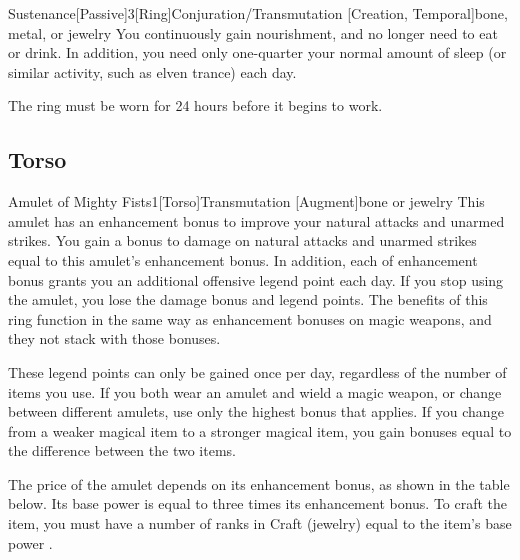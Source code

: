         \begin{magicitemdef}{Sustenance}[Passive]{3}[Ring]{Conjuration/Transmutation [Creation, Temporal]}{bone, metal, or jewelry}
             You continuously gain nourishment, and no longer need to eat or drink.
            In addition, you need only one-quarter your normal amount of sleep (or similar activity, such as elven trance) each day.

            The ring must be worn for 24 hours before it begins to work.
        \end{magicitemdef}

    \subsection{Torso}

        \begin{magicitemdef}{Amulet of Mighty Fists}{1}[Torso]{Transmutation [Augment]}{bone or jewelry}
             This amulet has an enhancement bonus to improve your natural attacks and unarmed strikes.
            You gain a bonus to damage on natural attacks and unarmed strikes equal to this amulet's enhancement bonus.
            In addition, each  of enhancement bonus grants you an additional offensive legend point each day.
            If you stop using the amulet, you lose the damage bonus and legend points.
            The benefits of this ring function in the same way as enhancement bonuses on magic weapons, and they not stack with those bonuses.

            These legend points can only be gained once per day, regardless of the number of items you use.
            If you both wear an amulet and wield a magic weapon, or change between different amulets, use only the highest bonus that applies.
            If you change from a weaker magical item to a stronger magical item, you gain bonuses equal to the difference between the two items.

            \spellspecial The price of the amulet depends on its enhancement bonus, as shown in the table below.
            Its base power is equal to three times its enhancement bonus.
            To craft the item, you must have a number of ranks in Craft (jewelry) equal to the item's base power .
        \end{magicitemdef}

